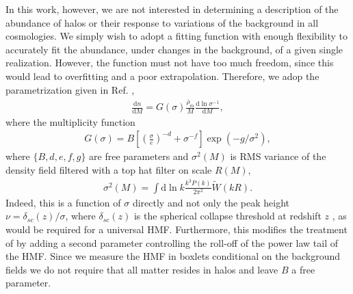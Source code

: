 In this work, however, we are not interested in determining a description of the abundance of halos or their response to variations of the background in all cosmologies. We simply wish to adopt a fitting function with enough flexibility to accurately fit the abundance, under changes in the background, of a given single realization. However, the function must not have too much freedom, since this would lead to overfitting and a poor extrapolation. Therefore, we adop the parametrization given in Ref. \citep{aemulushmf},
\begin{align}
\frac{\mathrm{d}n}{\mathrm{d}M} = G(\sigma)\frac{\overline{\rho}_m}{M}\frac{\mathrm{d}\ln{\sigma^{-1}}}{\mathrm{d}M}, \label{aemulus_hmf}
\end{align}
where the multiplicity function
\begin{align}
G(\sigma) = B \left[ \left( \frac{\sigma}{e}\right)^{-d} + \sigma^{-f} \right] \exp{\left( -g / \sigma^2 \right)}, \label{aemulus_G}
\end{align}
where $\{B, d, e, f, g\}$ are free parameters and $\sigma^2(M)$ is RMS variance of the density field filtered with a top hat filter on scale $R(M)$,
\begin{align}
\sigma^2(M) = \int \mathrm{d}\ln{k} \frac{k^3 P(k)}{2\pi^2} \tilde{W}(kR).
\end{align}
Indeed, this is a function of $\sigma$ directly and not only the peak height $\nu = \delta_{sc}(z)/\sigma$, where $\delta_{sc}(z)$ is the spherical collapse threshold at redshift $z$ \citep{halomodelreview}, as would be required for a universal HMF. Furthermore, this modifies the treatment of \citep{tinker2008} by adding a second parameter controlling the roll-off of the power law tail of the HMF. Since we measure the HMF in boxlets conditional on the background fields we do not require that all matter resides in halos and leave $B$ a free parameter.

